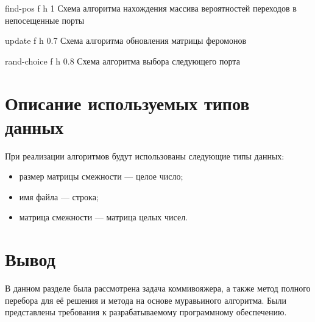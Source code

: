 {find-pos} %
{f} %
{h} %
{1\textwidth} %
{Схема алгоритма нахождения массива вероятностей переходов в непосещенные порты} %

{update} %
{f} %
{h} %
{0.7\textwidth} %
{Схема алгоритма обновления матрицы феромонов} %


{rand-choice} %
{f} %
{h} %
{0.8\textwidth} %
{Схема алгоритма выбора следующего порта} %



\section{Описание используемых типов данных}
При реализации алгоритмов будут использованы следующие типы данных:
\begin{itemize}[label=---]
	\item размер матрицы смежности --- целое число;
	\item имя файла --- строка;
	\item матрица смежности --- матрица целых чисел.
\end{itemize}

\section*{Вывод}
В данном разделе была рассмотрена задача коммивояжера, а также метод полного перебора для её решения и метода на основе муравьиного алгоритма. Были представлены требования к разрабатываемому программному обеспечению.
